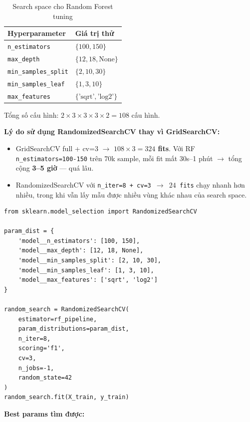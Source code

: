 \documentclass[12pt, a4paper]{article}
\begin{document}
\begin{table}[h!]
\centering
\caption{Search space cho Random Forest tuning}
\begin{tabular}{|l|l|}
\hline
\textbf{Hyperparameter} & \textbf{Giá trị thử} \\ \hline
\texttt{n\_estimators}      & $\{100, 150\}$ \\ \hline
\texttt{max\_depth}         & $\{12, 18, \text{None}\}$ \\ \hline
\texttt{min\_samples\_split}& $\{2, 10, 30\}$ \\ \hline
\texttt{min\_samples\_leaf} & $\{1, 3, 10\}$ \\ \hline
\texttt{max\_features}      & $\{\text{'sqrt'}, \text{'log2'}\}$ \\ \hline
\end{tabular}
\end{table}

Tổng số cấu hình: $2 \times 3 \times 3 \times 3 \times 2 = 108$ cấu hình.

\textbf{Lý do sử dụng RandomizedSearchCV thay vì GridSearchCV:}

\begin{itemize}
    \item GridSearchCV full + cv=3 $\to$ \textbf{$108 \times 3 = 324$ fits}. Với RF \texttt{n\_estimators=100-150} trên 70k sample, mỗi fit mất 30s--1 phút $\to$ tổng cộng \textbf{3--5 giờ} --- quá lâu.

    \item RandomizedSearchCV với \texttt{n\_iter=8 + cv=3 $\to$ $24$ fits} chạy nhanh hơn nhiều, trong khi vẫn lấy mẫu được nhiều vùng khác nhau của search space.
\end{itemize}

\begin{lstlisting}[caption={Khởi tạo RandomizedSearchCV cho RF}]
from sklearn.model_selection import RandomizedSearchCV

param_dist = {
    'model__n_estimators': [100, 150],
    'model__max_depth': [12, 18, None],
    'model__min_samples_split': [2, 10, 30],
    'model__min_samples_leaf': [1, 3, 10],
    'model__max_features': ['sqrt', 'log2']
}

random_search = RandomizedSearchCV(
    estimator=rf_pipeline,
    param_distributions=param_dist,
    n_iter=8,
    scoring='f1',
    cv=3,
    n_jobs=-1,
    random_state=42
)
random_search.fit(X_train, y_train)
\end{lstlisting}

\textbf{Best params tìm được:}
\end{document}
